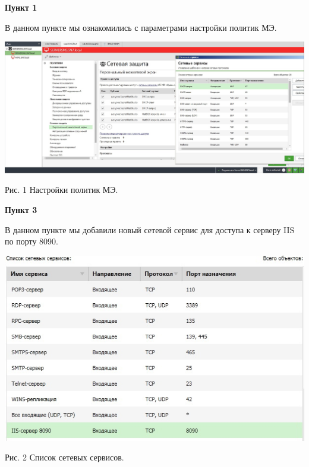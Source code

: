 \documentclass[a4paper,14pt]{extarticle}
\begin{document}
    \textbf{Пункт 1}
    \vspace{-3ex}
    \begin{center}
        \singlespacing
        В данном пункте мы ознакомились с параметрами настройки политик МЭ.

        \includegraphics[scale=0.3]{pics/1.jpg}

       Рис. 1 Настройки политик МЭ.
    \end{center}

    \textbf{Пункт 3}
    \vspace{-3ex}
    \begin{center}
        \singlespacing
        В данном пункте мы добавили новый сетевой сервис для доступа к серверу IIS по порту 8090.


        \includegraphics[scale=0.6]{pics/3.jpg}

       Рис. 2 Список сетевых сервисов.
    \end{center}
\end{document}
